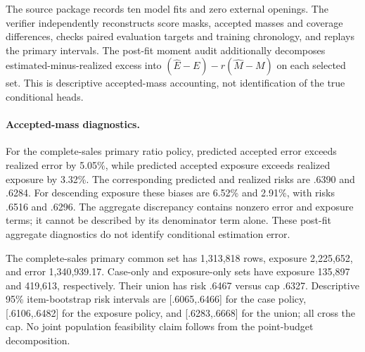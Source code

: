 The source package records ten model fits and zero external openings. The verifier independently reconstructs score masks, accepted masses and coverage differences, checks paired evaluation targets and training chronology, and replays the primary intervals. The post-fit moment audit additionally decomposes estimated-minus-realized excess into $(\hat E-E)-r(\hat M-M)$ on each selected set. This is descriptive accepted-mass accounting, not identification of the true conditional heads.

\paragraph{Accepted-mass diagnostics.}
For the complete-sales primary ratio policy, predicted accepted error exceeds realized error by 5.05\%, while predicted accepted exposure exceeds realized exposure by 3.32\%. The corresponding predicted and realized risks are .6390 and .6284. For descending exposure these biases are 6.52\% and 2.91\%, with risks .6516 and .6296. The aggregate discrepancy contains nonzero error and exposure terms; it cannot be described by its denominator term alone. These post-fit aggregate diagnostics do not identify conditional estimation error.

The complete-sales primary common set has 1,313,818 rows, exposure 2,225,652, and error 1,340,939.17. Case-only and exposure-only sets have exposure 135,897 and 419,613, respectively. Their union has risk .6467 versus cap .6327. Descriptive 95\% item-bootstrap risk intervals are [.6065,.6466] for the case policy, [.6106,.6482] for the exposure policy, and [.6283,.6668] for the union; all cross the cap. No joint population feasibility claim follows from the point-budget decomposition.

